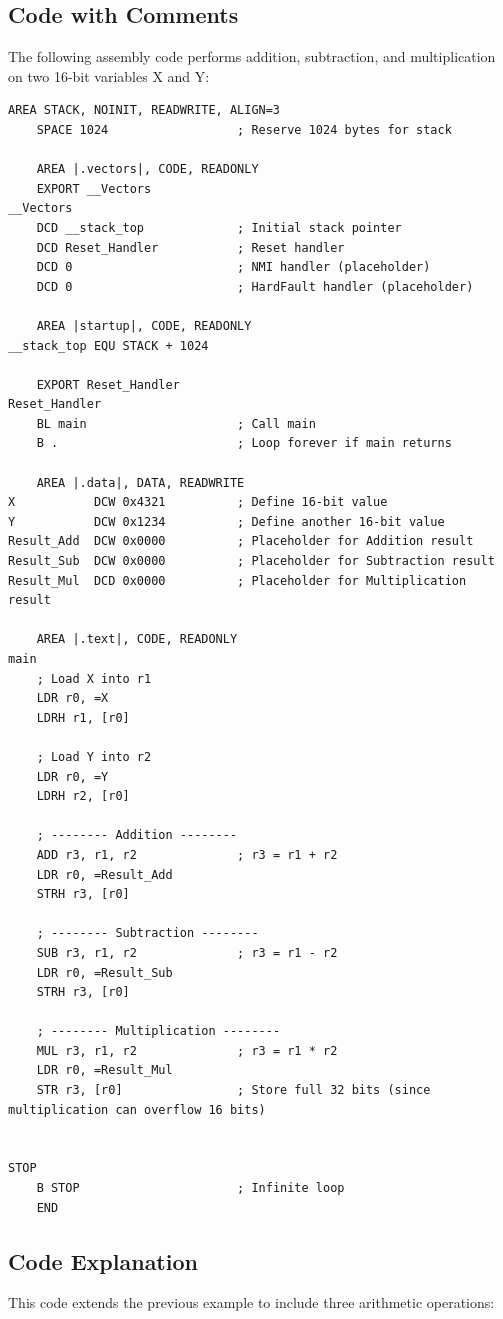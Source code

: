 \documentclass[12pt,a4paper]{article}
\begin{document}
\subsection{Code with Comments}
The following assembly code performs addition, subtraction, and multiplication on two 16-bit variables X and Y:

\begin{lstlisting}[language={}]
    AREA STACK, NOINIT, READWRITE, ALIGN=3
    SPACE 1024                  ; Reserve 1024 bytes for stack

    AREA |.vectors|, CODE, READONLY
    EXPORT __Vectors
__Vectors
    DCD __stack_top             ; Initial stack pointer
    DCD Reset_Handler           ; Reset handler
    DCD 0                       ; NMI handler (placeholder)
    DCD 0                       ; HardFault handler (placeholder)

    AREA |startup|, CODE, READONLY
__stack_top EQU STACK + 1024

    EXPORT Reset_Handler
Reset_Handler
    BL main                     ; Call main
    B .                         ; Loop forever if main returns

    AREA |.data|, DATA, READWRITE
X           DCW 0x4321          ; Define 16-bit value
Y           DCW 0x1234          ; Define another 16-bit value
Result_Add  DCW 0x0000          ; Placeholder for Addition result
Result_Sub  DCW 0x0000          ; Placeholder for Subtraction result
Result_Mul  DCD 0x0000          ; Placeholder for Multiplication result

    AREA |.text|, CODE, READONLY
main
    ; Load X into r1
    LDR r0, =X
    LDRH r1, [r0]

    ; Load Y into r2
    LDR r0, =Y
    LDRH r2, [r0]

    ; -------- Addition --------
    ADD r3, r1, r2              ; r3 = r1 + r2
    LDR r0, =Result_Add
    STRH r3, [r0]

    ; -------- Subtraction --------
    SUB r3, r1, r2              ; r3 = r1 - r2
    LDR r0, =Result_Sub
    STRH r3, [r0]

    ; -------- Multiplication --------
    MUL r3, r1, r2              ; r3 = r1 * r2
    LDR r0, =Result_Mul
    STR r3, [r0]                ; Store full 32 bits (since multiplication can overflow 16 bits)
	

STOP
    B STOP                      ; Infinite loop
    END
\end{lstlisting}

\subsection{Code Explanation}
This code extends the previous example to include three arithmetic operations:
\end{document}
